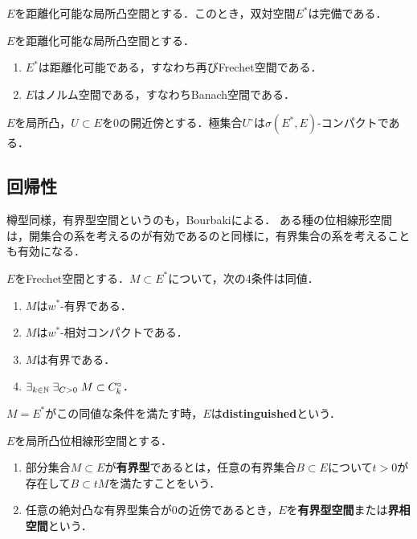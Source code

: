 \documentclass[uplatex,dvipdfmx]{jsreport}
\begin{document}
\begin{theorem}
    $E$を距離化可能な局所凸空間とする．このとき，双対空間$E^*$は完備である．
\end{theorem}

\begin{corollary}
    $E$を距離化可能な局所凸空間とする．
    \begin{enumerate}
        \item $E^*$は距離化可能である，すなわち再びFrechet空間である．
        \item $E$はノルム空間である，すなわちBanach空間である．
    \end{enumerate}
\end{corollary}

\begin{theorem}
    $E$を局所凸，$U\subset E$を$0$の開近傍とする．極集合$U^\circ$は$\sigma(E^*,E)$-コンパクトである．
\end{theorem}

\subsection{回帰性}

\begin{tcolorbox}[colframe=ForestGreen, colback=ForestGreen!10!white,breakable,colbacktitle=ForestGreen!40!white,coltitle=black,fonttitle=\bfseries\sffamily,
title=]
    樽型同様，有界型空間というのも，Bourbakiによる．
    ある種の位相線形空間は，開集合の系を考えるのが有効であるのと同様に，有界集合の系を考えることも有効になる．
\end{tcolorbox}

\begin{theorem}
    $E$をFrechet空間とする．$M\subset E^*$について，次の4条件は同値．
    \begin{enumerate}
        \item $M$は$w^*$-有界である．
        \item $M$は$w^*$-相対コンパクトである．
        \item $M$は有界である．
        \item $\exists_{k\in\mathbb{N}}\;\exists_{C>0}\;M\subset C^\circ_k$．
    \end{enumerate}
    $M=E^*$がこの同値な条件を満たす時，$E$は\textbf{distinguished}という．
\end{theorem}

\begin{definition}
    $E$を局所凸位相線形空間とする．
    \begin{enumerate}
        \item 部分集合$M\subset E$が\textbf{有界型}であるとは，任意の有界集合$B\subset E$について$t>0$が存在して$B\subset tM$を満たすことをいう．
        \item 任意の絶対凸な有界型集合が$0$の近傍であるとき，$E$を\textbf{有界型空間}または\textbf{界相空間}という．
    \end{enumerate}
\end{definition}
\end{document}
